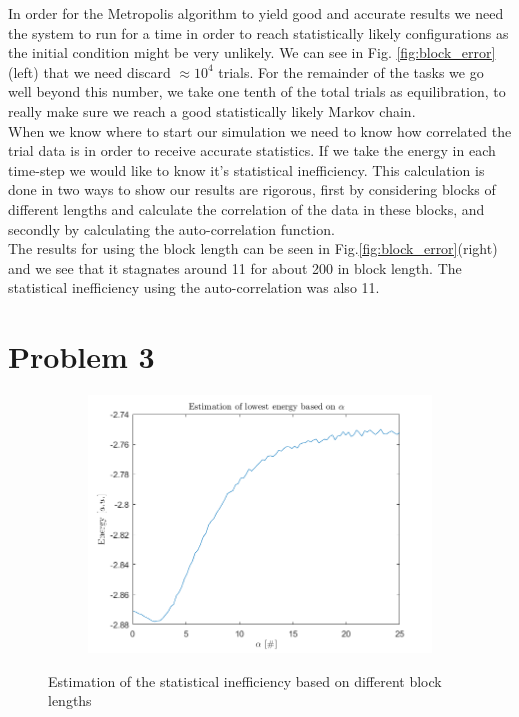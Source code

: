 In order for the Metropolis algorithm to yield good and accurate results we need the system to run for a time in order to reach statistically likely configurations as the initial condition might be very unlikely. We can see in Fig. \ref{fig:block_error}(left) that we need discard $\approx10^4$ trials. For the remainder of the tasks we go well beyond this number, we take one tenth of the total trials as equilibration, to really make sure we reach a good statistically likely Markov chain.\\

When we know where to start our simulation we need to know how correlated the trial data is in order to receive accurate statistics. If we take the energy in each time-step we would like to know it's statistical inefficiency. This calculation is done in two ways to show our results are rigorous, first by considering blocks of different lengths and calculate the correlation of the data in these blocks, and secondly by calculating the auto-correlation function.\\

The results for using the block length can be seen in Fig.\ref{fig:block_error}(right) and we see that it stagnates around 11 for about 200 in block length. The statistical inefficiency using the auto-correlation was also 11.




\section*{Problem 3}


\begin{figure}[H]
	\centering
	\captionsetup[subfigure]{justification=centering}
	\begin{subfigure}[b]{0.4\textwidth}
		\centering
		\includegraphics[width=\textwidth]{graphics/task3/lowest_energy.png}
	\end{subfigure}
	\caption{Estimation of the statistical inefficiency based on different block lengths}
	\label{fig:optimize_alpha}
\end{figure}



